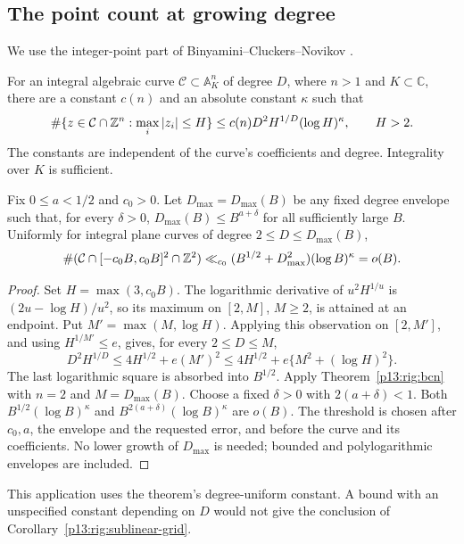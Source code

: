 \subsection{The point count at growing degree}

We use the integer-point part of Binyamini--Cluckers--Novikov
\cite[Theorem~2, equation~(27), in the specified author
version]{binyaminicluckersnovikov2024}.

\begin{theorem}
\label{p13:rig:bcn}
For an integral algebraic curve $\mathcal C\subset\mathbb A^n_K$
of degree $D$, where $n>1$ and $K\subset\mathbb C$, there are
a constant $c(n)$ and an absolute constant $\kappa$ such that
\[
 \#\{z\in\mathcal C\cap\mathbb Z^n:\max_i|z_i|\le H\}
       \le c(n)D^2H^{1/D}(\log H)^\kappa,
       \qquad H>2.
\]
The constants are independent of the curve's coefficients
and degree.  Integrality over $K$ is sufficient.
\end{theorem}

\begin{corollary}
\label{p13:rig:sublinear-grid}
Fix $0\le a<1/2$ and $c_0>0$. Let $D_{\max}=D_{\max}(B)$
be any fixed degree envelope such that, for every $\delta>0$,
$D_{\max}(B)\le B^{a+\delta}$ for all sufficiently large $B$.
Uniformly for integral plane curves of degree $2\le D\le D_{\max}(B)$,
\[
 \#(\mathcal C\cap[-c_0B,c_0B]^2\cap\mathbb Z^2)
 \ll_{c_0}(B^{1/2}+D_{\max}^2)(\log B)^\kappa=o(B).
\]
\end{corollary}

\begin{proof}
Set $H=\max(3,c_0B)$.  The logarithmic derivative of
$u^2H^{1/u}$ is $(2u-\log H)/u^2$, so its maximum on
$[2,M]$, $M\ge2$, is attained at an endpoint.
Put $M'=\max(M,\log H)$. Applying this observation on $[2,M']$,
and using $H^{1/M'}\le e$, gives, for every $2\le D\le M$,
\[
 D^2H^{1/D}
 \le 4H^{1/2}+e(M')^2
 \le4H^{1/2}+e\{M^2+(\log H)^2\}.
\]
The last logarithmic square is absorbed into $B^{1/2}$.
Apply Theorem~\ref{p13:rig:bcn} with $n=2$ and $M=D_{\max}(B)$.
Choose a fixed $\delta>0$ with $2(a+\delta)<1$. Both
$B^{1/2}(\log B)^\kappa$ and
$B^{2(a+\delta)}(\log B)^\kappa$ are $o(B)$.
The threshold is chosen after $c_0,a$, the envelope and the requested
error, and before the curve and its coefficients. No lower growth of
$D_{\max}$ is needed; bounded and polylogarithmic envelopes are included.
\end{proof}

This application uses the theorem's degree-uniform constant.
A bound with an unspecified constant depending on $D$ would
not give the conclusion of Corollary~\ref{p13:rig:sublinear-grid}.

